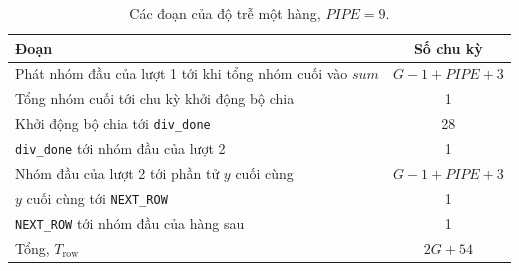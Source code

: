 \begin{table}[htbp]
\centering
\small
\begin{tabular}{lc}
\toprule
Đoạn & Số chu kỳ \\
\midrule
Phát nhóm đầu của lượt 1 tới khi tổng nhóm cuối vào $\mathit{sum}$ & $G - 1 + \mathit{PIPE} + 3$ \\
Tổng nhóm cuối tới chu kỳ khởi động bộ chia & 1 \\
Khởi động bộ chia tới \texttt{div\_done} & 28 \\
\texttt{div\_done} tới nhóm đầu của lượt 2 & 1 \\
Nhóm đầu của lượt 2 tới phần tử $y$ cuối cùng & $G - 1 + \mathit{PIPE} + 3$ \\
$y$ cuối cùng tới \texttt{NEXT\_ROW} & 1 \\
\texttt{NEXT\_ROW} tới nhóm đầu của hàng sau & 1 \\
\midrule
Tổng, $T_{\text{row}}$ & $2G + 54$ \\
\bottomrule
\end{tabular}
\caption{Các đoạn của độ trễ một hàng, $\mathit{PIPE} = 9$.}
\label{tab:trow}
\end{table}
